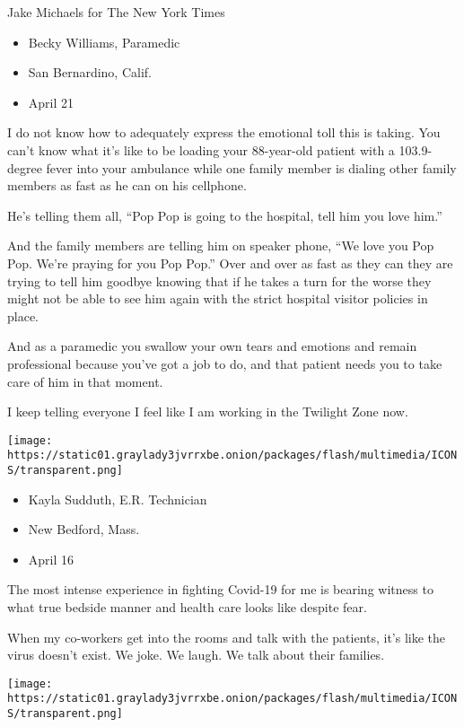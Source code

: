 Jake Michaels for The New York Times

\begin{itemize}
\tightlist
\item
  Becky Williams, Paramedic
\item
  San Bernardino, Calif.
\item
  April 21
\end{itemize}

I do not know how to adequately express the emotional toll this is
taking. You can't know what it's like to be loading your 88-year-old
patient with a 103.9-degree fever into your ambulance while one family
member is dialing other family members as fast as he can on his
cellphone.

He's telling them all, ``Pop Pop is going to the hospital, tell him you
love him.''

And the family members are telling him on speaker phone, ``We love you
Pop Pop. We're praying for you Pop Pop.'' Over and over as fast as they
can they are trying to tell him goodbye knowing that if he takes a turn
for the worse they might not be able to see him again with the strict
hospital visitor policies in place.

And as a paramedic you swallow your own tears and emotions and remain
professional because you've got a job to do, and that patient needs you
to take care of him in that moment.

I keep telling everyone I feel like I am working in the Twilight Zone
now.

\texttt{[image: https://static01.graylady3jvrrxbe.onion/packages/flash/multimedia/ICONS/transparent.png]}

\begin{itemize}
\tightlist
\item
  Kayla Sudduth, E.R. Technician
\item
  New Bedford, Mass.
\item
  April 16
\end{itemize}

The most intense experience in fighting Covid-19 for me is bearing
witness to what true bedside manner and health care looks like despite
fear.

When my co-workers get into the rooms and talk with the patients, it's
like the virus doesn't exist. We joke. We laugh. We talk about their
families.

\texttt{[image: https://static01.graylady3jvrrxbe.onion/packages/flash/multimedia/ICONS/transparent.png]}

